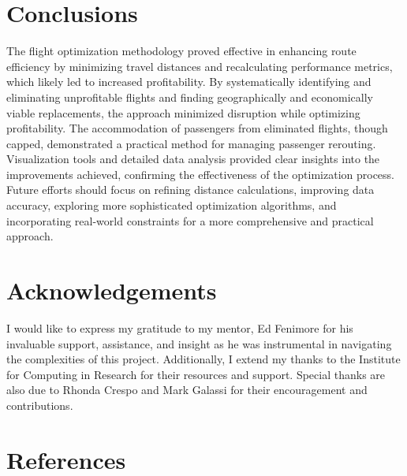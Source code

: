 \documentclass{article}
\begin{document}
\section{Conclusions}

The flight optimization methodology proved effective in enhancing route efficiency by minimizing travel distances and recalculating performance metrics, which likely led to increased profitability. By systematically identifying and eliminating unprofitable flights and finding geographically and economically viable replacements, the approach minimized disruption while optimizing profitability. The accommodation of passengers from eliminated flights, though capped, demonstrated a practical method for managing passenger rerouting. Visualization tools and detailed data analysis provided clear insights into the improvements achieved, confirming the effectiveness of the optimization process. Future efforts should focus on refining distance calculations, improving data accuracy, exploring more sophisticated optimization algorithms, and incorporating real-world constraints for a more comprehensive and practical approach.

\section{Acknowledgements}

I would like to express my gratitude to my mentor, Ed Fenimore for his invaluable support, assistance, and insight as he was instrumental in navigating the complexities of this project. Additionally, I extend my thanks to the Institute for Computing in Research for their resources and support. Special thanks are also due to Rhonda Crespo and Mark Galassi for their encouragement and contributions.

\newpage

\section*{\centering References}
\end{document}
